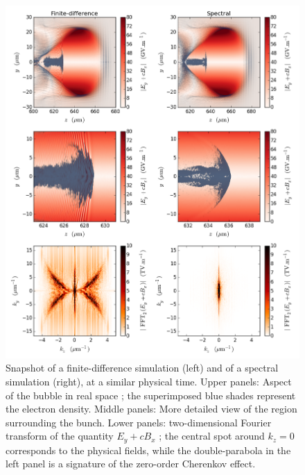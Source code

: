 \documentclass[1p,times]{elsarticle}
\begin{document}
\begin{figure}[!h]
\centering
\includegraphics[width=\textwidth]{figures/Cherenkov.png}
\caption{\label{fig:Cherenkov}Snapshot of a finite-difference
  simulation (left) and of a spectral simulation (right), at a similar
  physical time. Upper panels: Aspect of the bubble in real space ; 
the superimposed blue shades represent the electron
  density. Middle panels: More detailed view of the region surrounding the
  bunch. Lower panels: two-dimensional Fourier transform of the
  quantity $E_y + cB_x$ ; the central spot around $k_z=0$ corresponds
  to the physical fields, while the double-parabola in the left panel
  is a signature of the zero-order Cherenkov effect.}
\end{figure}

\end{document}
